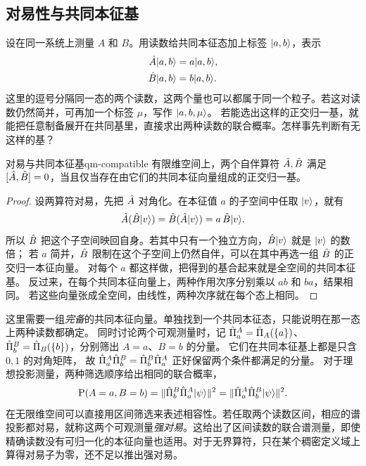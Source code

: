 \subsection{对易性与共同本征基}
设在同一系统上测量 $A$ 和 $B$。用读数给共同本征态加上标签 $\lvert a,b\rangle$，表示
\begin{subequations}\label{eq:qm-joint-eigenstate}
    \begin{align}
        \hat{A}\lvert a,b\rangle &= a\lvert a,b\rangle,\\
        \hat{B}\lvert a,b\rangle &= b\lvert a,b\rangle.
    \end{align}
\end{subequations}
这里的逗号分隔同一态的两个读数，这两个量也可以都属于同一个粒子。若这对读数仍然简并，可再加一个标签 $\mu$，写作 $\lvert a,b,\mu\rangle$。
若能选出这样的正交归一基，就能把任意制备展开在共同基里，直接求出两种读数的联合概率。怎样事先判断有无这样的基？
\begin{theorem}{对易与共同本征基}{qm-compatible}
    有限维空间上，两个自伴算符 $\hat{A},\hat{B}$ 满足 $[\hat{A},\hat{B}] = 0$，当且仅当存在由它们的共同本征向量组成的正交归一基。
\end{theorem}
\begin{proof}
设两算符对易，先把 $\hat{A}$ 对角化。在本征值 $a$ 的子空间中任取 $\lvert v\rangle$，就有
\[
   \hat{A}(\hat{B}\lvert v\rangle) = \hat{B}(\hat{A}\lvert v\rangle) = a\,\hat{B}\lvert v\rangle .
\]
所以 $\hat{B}$ 把这个子空间映回自身。若其中只有一个独立方向，$\hat{B}\lvert v\rangle$ 就是 $\lvert v\rangle$ 的数倍；
若 $a$ 简并，$\hat{B}$ 限制在这个子空间上仍然自伴，可以在其中再选一组 $\hat{B}$ 的正交归一本征向量。
对每个 $a$ 都这样做，把得到的基合起来就是全空间的共同本征基。
反过来，在每个共同本征向量上，两种作用次序分别乘以 $ab$ 和 $ba$，结果相同。
若这些向量张成全空间，由线性，两种次序就在每个态上相同。
\end{proof}
\begin{remark}
    这里需要一组\emph{完备}的共同本征向量。单独找到一个共同本征态，只能说明在那一态上两种读数都确定。
    同时讨论两个可观测量时，记 $\hat{\Pi}_a^A = \hat{\Pi}_A(\{a\})$、$\hat{\Pi}_b^B = \hat{\Pi}_B(\{b\})$，分别筛出 $A = a$、$B = b$ 的分量。
    它们在共同本征基上都是只含 $0,1$ 的对角矩阵，
    故 $\hat{\Pi}_a^A\hat{\Pi}_b^B = \hat{\Pi}_b^B\hat{\Pi}_a^A$ 正好保留两个条件都满足的分量。
    对于理想投影测量，两种筛选顺序给出相同的联合概率，
    \begin{equation}
        \operatorname{P}(A = a,B = b) = \lVert\hat{\Pi}_b^B\hat{\Pi}_a^A\lvert\psi\rangle\rVert^2
        = \lVert\hat{\Pi}_a^A\hat{\Pi}_b^B\lvert\psi\rangle\rVert^2 .
    \end{equation}
    在无限维空间可以直接用区间筛选来表述相容性。若任取两个读数区间，相应的谱投影都对易，就称这两个可观测量\emph{强对易}。这给出了区间读数的联合谱测量，即使精确读数没有可归一化的本征向量也适用。对于无界算符，只在某个稠密定义域上算得对易子为零，还不足以推出强对易。
\end{remark}

